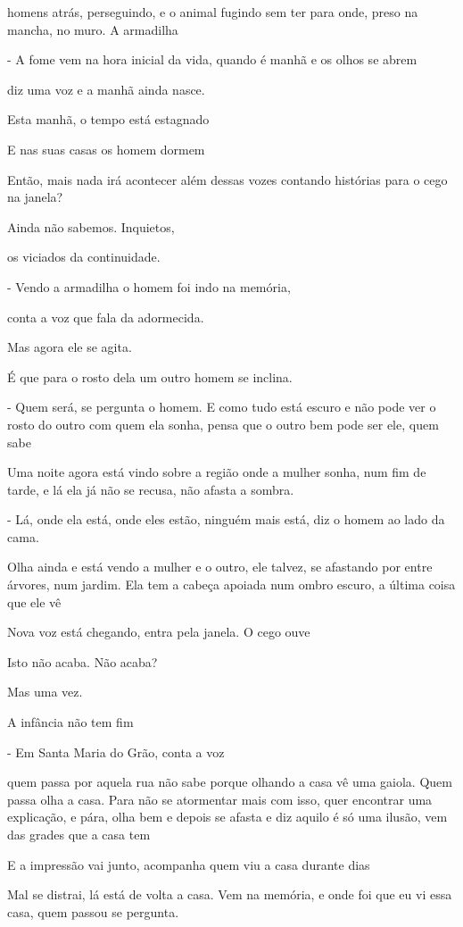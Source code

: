 homens atrás, perseguindo, e o animal fugindo sem ter para onde, preso
na mancha, no muro. A armadilha

- A fome vem na hora inicial da vida, quando é manhã e os olhos se abrem

diz uma voz e a manhã ainda nasce.

Esta manhã, o tempo está estagnado

E nas suas casas os homem dormem

Então, mais nada irá acontecer além dessas vozes contando histórias para
o cego na janela?

Ainda não sabemos. Inquietos,

os viciados da continuidade.

- Vendo a armadilha o homem foi indo na memória,

conta a voz que fala da adormecida.

Mas agora ele se agita.

É que para o rosto dela um outro homem se inclina.

- Quem será, se pergunta o homem. E como tudo está escuro e não pode ver
o rosto do outro com quem ela sonha, pensa que o outro bem pode ser ele,
quem sabe

Uma noite agora está vindo sobre a região onde a mulher sonha, num fim
de tarde, e lá ela já não se recusa, não afasta a sombra.

- Lá, onde ela está, onde eles estão, ninguém mais está, diz o homem ao
lado da cama.

Olha ainda e está vendo a mulher e o outro, ele talvez, se afastando por
entre árvores, num jardim. Ela tem a cabeça apoiada num ombro escuro, a
última coisa que ele vê

Nova voz está chegando, entra pela janela. O cego ouve

Isto não acaba. Não acaba?

Mas uma vez.

A infância não tem fim

- Em Santa Maria do Grão, conta a voz

quem passa por aquela rua não sabe porque olhando a casa vê uma gaiola.
Quem passa olha a casa. Para não se atormentar mais com isso, quer
encontrar uma explicação, e pára, olha bem e depois se afasta e diz
aquilo é só uma ilusão, vem das grades que a casa tem

E a impressão vai junto, acompanha quem viu a casa durante dias

Mal se distrai, lá está de volta a casa. Vem na memória, e onde foi que
eu vi essa casa, quem passou se pergunta.

